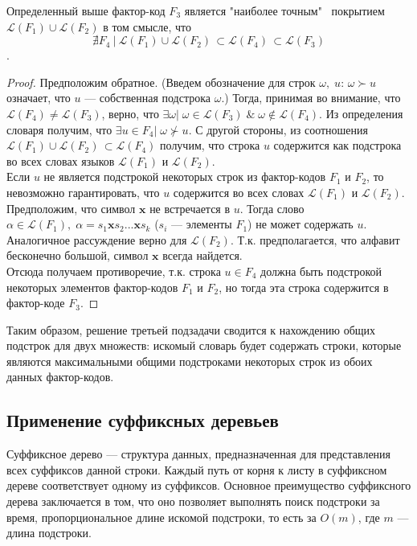 \documentclass[14pt, russian]{scrartcl}
\newcommand{\Lang}{\ensuremath{\mathcal{L}}}
\begin{document}
\begin{Statement}
    Определенный выше фактор-код $F_3$ является "наиболее точным" \, покрытием
    $\Lang(F_1) \cup \Lang(F_2) $
    в том смысле, что 
    $$ \nexists F_4\ | \ \Lang(F_1) \cup \Lang(F_2) \, \subset \Lang(F_4) \, \subset \Lang(F_3)$$.
\end{Statement}

\begin{proof}
    Предположим обратное. (Введем обозначение для строк $\omega, \; u$: $\omega \succ u$ означает, что $u$ --- собственная подстрока $\omega$.) Тогда, принимая во внимание, что $\Lang(F_4) \neq \Lang(F_3)$, верно, что $\exists \omega | \; \omega \in \Lang(F_3) \; \& \; \omega \notin \Lang(F_4)$. Из определения словаря получим, что $\exists u \in F_4 | \; \omega \not \succ u$. С другой стороны, из соотношения
    $ \Lang(F_1) \cup \Lang(F_2) \, \subset \Lang(F_4) $ получим, что строка $u$ содержится как подстрока во всех словах языков $\Lang(F_1)$ и $\Lang(F_2)$.
    \\
    Если $u$ не является подстрокой  некоторых строк из фактор-кодов $F_1$ и $F_2$, то невозможно гарантировать, что $u$ содержится во всех словах $\Lang(F_1)$ и $\Lang(F_2)$. Предположим, что символ $\textbf{x}$ не встречается в $u$. Тогда слово $\alpha \in \Lang(F_1), \; \alpha = s_1\textbf{x}s_2...\textbf{x}s_k$ ($s_i$ --- элементы $F_1$) не может содержать $u$. Аналогичное рассуждение верно для $\Lang(F_2)$. Т.к. предполагается, что алфавит бесконечно большой, символ $\textbf{x}$ всегда найдется.
    \\
    Отсюда получаем противоречие, т.к. строка $u \in F_4$ должна быть подстрокой некоторых элементов фактор-кодов $F_1$ и $F_2$, но тогда эта строка содержится в фактор-коде $F_3$.
\end{proof}


Таким образом, решение третьей подзадачи сводится к нахождению общих подстрок для двух множеств: искомый словарь будет содержать строки, которые являются максимальными общими подстроками некоторых строк из обоих данных фактор-кодов.


\subsection{Применение суффиксных деревьев}

Суффиксное дерево — структура данных, предназначенная для представления всех суффиксов данной строки. Каждый путь от корня к листу в суффиксном дереве соответствует одному из суффиксов. Основное преимущество суффиксного дерева заключается в том, что оно позволяет выполнять поиск подстроки за время, пропорциональное длине искомой подстроки, то есть за \(O(m)\), где \(m\) — длина подстроки. 
\end{document}
